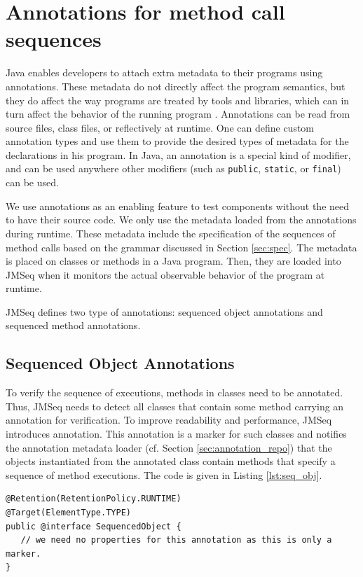 \section{Annotations for method call sequences} \label{sec:impl_annot}
Java enables developers to attach extra metadata to their programs using annotations.
These metadata do not directly affect the program semantics, but they do affect the
way programs are treated by tools and libraries, which can in turn affect the
behavior of the running program \cite{Java_5_Annotations}. Annotations can be
read from source files, class files, or reflectively at runtime. 
One can define custom annotation types and use them to provide the desired types of metadata for the declarations in his program. 
In Java, an annotation is a special kind of modifier, and can be used anywhere other
modifiers (such as {\small\texttt{public}}, {\small\texttt{static}}, or
{\small\texttt{final}}) can be used.

We use annotations as an enabling feature to test components without the need to have their source code.
We only use the metadata loaded from the annotations during runtime.
These metadata include the specification of the sequences of method calls
based on the grammar discussed in Section \ref{sec:spec}. The metadata
is placed on classes or methods in a Java program. 
Then, they are loaded into JMSeq when it monitors the actual observable
behavior of the program at runtime.

JMSeq defines two type of annotations: sequenced object annotations and
sequenced method annotations.

\subsection{Sequenced Object Annotations}

To verify the sequence of executions, methods in classes need to be
annotated. Thus, JMSeq needs to detect all  classes that contain
some method carrying an annotation for verification. 
To improve readability and performance, JMSeq introduces
 annotation. This annotation is a marker
for such classes and notifies the annotation metadata loader (cf.
Section \ref{sec:annotation_repo}) that the objects instantiated from the annotated
class contain methods that specify a sequence of method executions. 
The code is given in Listing \ref{lst:seq_obj}.


\lstset{language=Java}
\begin{lstlisting}[label=lst:seq_obj, caption=SequencedObject Annotation Declaration]
@Retention(RetentionPolicy.RUNTIME)
@Target(ElementType.TYPE)
public @interface SequencedObject {
   // we need no properties for this annotation as this is only a marker.
}
\end{lstlisting}

